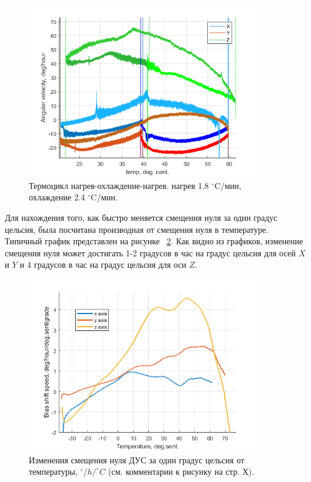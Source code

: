 \documentclass[a4paper,12pt]{article}
\begin{document}
\begin{figure}[hp!]
\centering
\includegraphics[width=0.9\textwidth]{circle.png} 
\caption{\label{fig:hyst_2} Термоцикл нагрев-охлаждение-нагрев. нагрев 1.8 $^{\circ}$C/мин, охлаждение 2.4 $^{\circ}$C/мин.}
\end{figure}

Для нахождения того, как быстро меняется смещения нуля за один градус цельсия, была посчитана производная от смещения нуля в температуре. Типичный график представлен на рисунке  ~\ref{fig:gradi}. Как видно из графиков, изменение смещения нуля может достигать 1-2 градусов в час на градус цельсия для осей $X$ и $Y$ и 4 градусов в час на градус цельсия для  оси $Z$.

\begin{figure}[hp!]
\centering
\includegraphics[width=0.9\textwidth]{gradient_labeled.png} 
\caption{\label{fig:gradi} Изменения смещения нуля ДУС за один градус цельсия от температуры, $^{\circ}/h/^{\circ}C$ (см. комментарии к рисунку на стр. Х).}
\end{figure}
\end{document}
